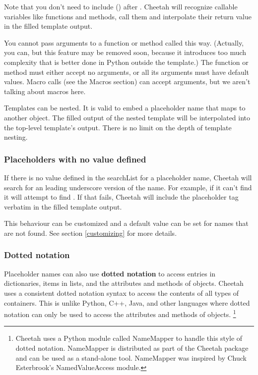 Note that you don't need to include () after .  Cheetah
will recognize callable variables like functions and methods, call them and
interpolate their return value in the filled template output.

You cannot pass arguments to a function or method called this way.  (Actually,
you can, but this feature may be removed soon, because it introduces too much
complexity that is better done in Python outside the template.)  The function or
method must either accept no arguments, or all its arguments must have default
values.  Macro calls (see the Macros section) can accept arguments, but we
aren't talking about macros here.

Templates can be nested. It is valid to embed a placeholder name that maps to
another  object.  The filled output of the nested template will be
interpolated into the top-level template's output.  There is no limit on the
depth of template nesting.

\subsubsection{Placeholders with no value defined}
If there is no value defined in the searchList for a placeholder name,
Cheetah will search for an leading underscore version of the name.  For
example, if it can't find  it will attempt to find
.  If that fails, Cheetah will include the placeholder
tag verbatim in the filled template output.

This behaviour can be customized and a default value can be set for names
that are not found. See section \ref{customizing} for more details.

\subsubsection{Dotted notation}
Placeholder names can also use {\bf dotted notation} to access entries in
dictionaries, items in lists, and the attributes and methods of objects.
Cheetah uses a consistent dotted notation syntax to access the contents
of all types of containers.  This is unlike Python, C++, Java, and other
languages where dotted notation can only be used to access the attributes and
methods of objects. \footnote{Cheetah uses a Python module called
  NameMapper to handle this style of dotted notation.  NameMapper is distributed
  as part of the Cheetah package and can be used as a stand-alone tool.
  NameMapper was inspired by Chuck Esterbrook's NamedValueAccess module.}

